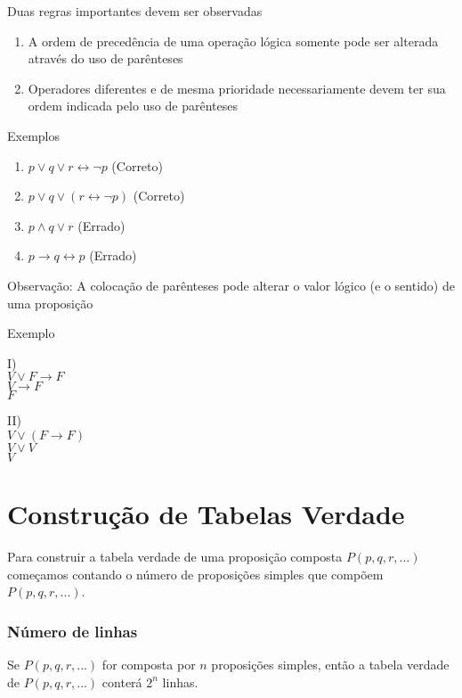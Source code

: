 Duas regras importantes devem ser observadas
\begin{enumerate}
\item A ordem de preced{\^e}ncia de uma opera{\c c}{\~a}o l{\'o}gica somente pode ser alterada atrav{\'e}s do uso de par{\^e}nteses
\item Operadores diferentes e de mesma prioridade necessariamente devem ter sua ordem indicada pelo uso de par{\^e}nteses
\end{enumerate}

Exemplos
\begin{enumerate}
\item $p\vee q\vee r\leftrightarrow\neg p$ (Correto)
\item $p\vee q\vee(r\leftrightarrow\neg p)$ (Correto)
\item $p\wedge q\vee r$ (Errado)
\item $p\rightarrow q\leftrightarrow p$ (Errado)
\end{enumerate}

Observa{\c c}{\~a}o: A coloca{\c c}{\~a}o de par{\^e}nteses pode alterar o valor l{\'o}gico (e o sentido) de uma proposi{\c c}{\~a}o

\begin{center}
Exemplo
\end{center} 
\begin{minipage}[l]{0,5\textwidth}
I)\\
$V\vee F\rightarrow F$\\
$V\rightarrow F$\\
$F$\\
\end{minipage}
\begin{minipage}[r]{0,5\textwidth}
II)\\
$V\vee(F\rightarrow F)$\\
$V\vee V$\\
$V$

\end{minipage}

\section{Constru{\c c}{\~a}o de Tabelas Verdade}

\hspace{0,5cm}Para construir a tabela verdade de uma proposi{\c c}{\~a}o composta $P(p,q,r,...)$ come{\c c}amos contando o n{\'u}mero de proposi{\c c}{\~o}es simples que comp{\~o}em $P(p,q,r,...)$.

\subsubsection{N{\'u}mero de linhas}
Se $P(p,q,r,...)$ for composta por $n$ proposi{\c c}{\~o}es simples, ent{\~a}o a tabela verdade de $P(p,q,r,...)$ conter{\'a} $2^{n}$ linhas.

